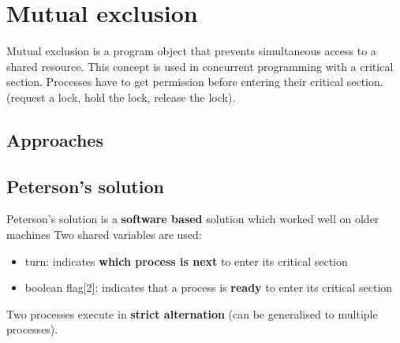\documentclass{article}
\newcommand{\inlinecode}[2]{\colorbox{lightgray}{\lstinline
[language=#1]$#2$}}
\begin{document}
\section{Mutual exclusion}
\begin{flushleft}
Mutual exclusion is a program object that prevents simultaneous access to a shared resource. This concept is used in concurrent programming with a critical section. Processes have to get permission before entering their critical section. (request a lock, hold the lock, release the lock).
\end{flushleft}

\subsection{Approaches}

\subsection{Peterson's solution}
\begin{flushleft}
Peterson’s solution is a \textbf{software based} solution which worked well on older machines Two shared variables are used:
\begin{itemize}
	\item turn: indicates \textbf{which process is next} to enter its critical section 
	\item boolean flag[2]: indicates that a process is \textbf{ready} to enter its critical section 
\end{itemize}
Two processes execute in \textbf{strict alternation} (can be generalised to multiple processes).
\end{flushleft}
\end{document}
